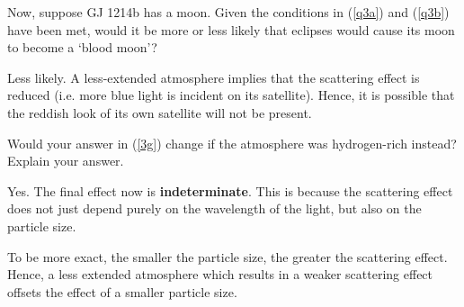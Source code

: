 \documentclass[a4paper,11pt,draft]{exam}
\begin{document}
\begin{questions}
\question[1]\label{3g}
	Now, suppose GJ 1214b has a moon. Given the conditions in (\ref{q3a}) and (\ref{q3b}) have been met, would it be more or less likely that eclipses would cause its moon to become a `blood moon'?
	\droppoints
	\begin{solution}
		Less likely. A less-extended atmosphere implies that the scattering effect is reduced (i.e. more blue light is incident on its satellite). Hence, it is possible that the reddish look of its own satellite will not be present.
	\end{solution}

\question[1]\label{3h}
	Would your answer in (\ref{3g}) change if the atmosphere was hydrogen-rich instead? Explain your answer.
	\droppoints
	\begin{solution}
		Yes. The final effect now is \textbf{indeterminate}. This is because the scattering effect does not just depend purely on the wavelength of the light, but also on the particle size.
		
		To be more exact, the smaller the particle size, the greater the scattering effect. Hence, a less extended atmosphere which results in a weaker scattering effect offsets the effect of a smaller particle size.
	\end{solution}

\end{questions}
\end{document}
